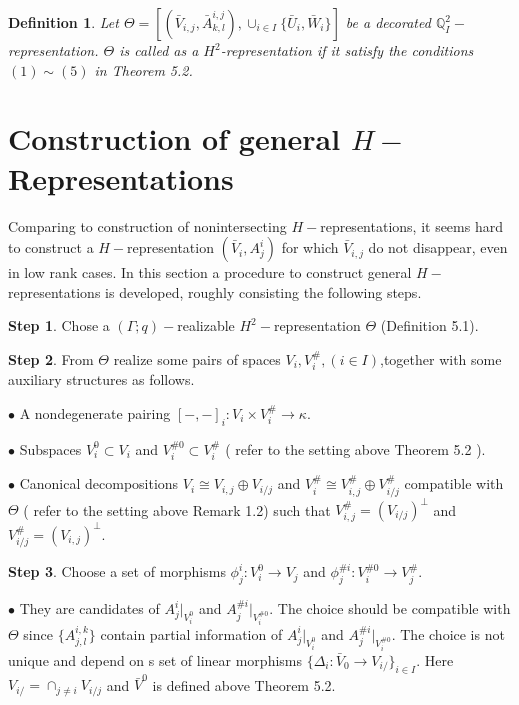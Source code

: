 \def\CTEXPreproc{Created by ctex v0.2.12, don't edit!}\documentclass[11pt]{article}
\newtheorem{defi}{Definition}[section]
\begin{document}
\begin{defi} Let  $\Theta = [ ( \bar{V}_{i,j} , \bar{A}^{i,j}_{k,l} ) ,  \cup_{i\in I} \{ \bar{U}_i ,\bar{W}_i \}    ] $ be a decorated $\mathbb{Q}^2 _I -$representation.  $\Theta$ is called as a $H^2$-representation if it satisfy the conditions $(1)\sim (5)$ in Theorem 5.2.

\end{defi}



\section{Construction of general $H-$Representations}

Comparing to construction of nonintersecting $H-$representations, it seems hard to construct a $H-$representation $( \bar{V}_{i} , A^i _j  )$ for which $\bar{V}_{i,j}$ do not disappear, even in low rank cases. In this section a procedure to construct general $H-$representations is developed, roughly consisting the following steps.


\noindent \textbf{Step 1}. Chose a $(\Gamma;q)-$realizable  $H^2 -$representation $\Theta $ (Definition 5.1).

\noindent \textbf{Step 2}.  From $\Theta$ realize some pairs of spaces $V_i , V^{\#}_i , (i\in I) $,together with some auxiliary structures as follows.

\noindent $\bullet$ A nondegenerate pairing  $[-,-]_i : V_i \times V^{\#}_i \rightarrow \kappa $.

\noindent $\bullet$ Subspaces $V^0 _i \subset V_i$ and $ V^{\# 0}_i \subset V^{\#} _i $ ( refer to the setting above Theorem 5.2  ).

\noindent $\bullet$ Canonical decompositions $V_i \cong V_{i,j}\oplus V_{i/j} $ and $V^{\#}_{i}\cong V^{\#}_{i,j}\oplus V^{\#}_{i/j}$ compatible with $\Theta$ ( refer to the setting above Remark 1.2) such that $V^{\#}_{i,j} = ( V_{i/j} )^{\perp}$ and $ V^{\#}_{i/j} = ( V_{i,j} )^{\perp}  $.

\noindent \textbf{Step 3}.  Choose a set of morphisms $\phi^i _j : V^0 _i \rightarrow V_j $ and $\phi^{\# i }_j : V^{\# 0}_i \rightarrow V^{\#}_j $.

\noindent $\bullet$ They are candidates of $A^i _j |_{ V^0 _i }$ and $A^{\# i} _j |_{ V^{\# 0} _i }$. The choice should be compatible with $\Theta$ since $\{ A^{i,k}_{j,l} \}$ contain partial information of $A^i _j |_{ V^0 _i }$ and $A^{\# i} _j |_{ V^{\# 0} _i }$. The choice is not unique and depend on s set of linear morphisms $\{  \Delta_i : \bar{V}_0 \rightarrow V_{i/} \}_{i\in I} $. Here
$V_{i/}= \cap_{j\neq i} V_{i/j}$ and $\bar{V}^0$ is defined above Theorem 5.2.
\end{document}
